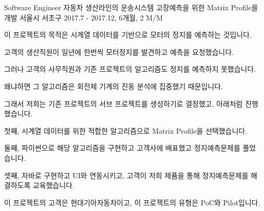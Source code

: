 \begin{cventries}
  \cventry
    {Software Engineer} %
    {자동차 생산라인의 운송시스템 고장예측을 위한 Matrix Profile을 개발} %
    {서울시 서초구} %
    {2017.7 - 2017.12, 6개월, 2 M/M} %
    {
      \begin{cvitems} %
        \item {이 프로젝트의 목적은 시계열 데이터를 기반으로 모터의 정지를 예측하는 것입니다.}
        \item {고객의 생산직원이 일년에 한번씩 모터정지를 발견하고 예측을 요청했습니다.}
        \item {그러나 고객의 사무직원과 기존 프로젝트의 알고리즘도 정지를 예측하지 못했습니다.}
        \item {왜냐하면 그 알고리즘은 회전체 기계의 진동 분석에 집중했기 때문입니다.}
        \item {그래서 저희는 기존 프로젝트의 서브 프로젝트를 생성하기로 결정했고, 아래처럼 진행했습니다.}
        \item {첫째, 시계열 데이터를 위한 적합한 알고리즘으로 Matrix Profile을 선택했습니다.}
        \item {둘째, 파이썬으로 해당 알고리즘을 구현하고 고객사에 배표했고 정지예측문제를 풀었습니다.}
        \item {셋째, 자바로 구현하고 UI와 연동시키고, 고객이 저희 제품을 통해 정지예측문제를 해결하도록 교육했습니다.}
        \item {이 프로젝트의 고객은 현대기아자동차이고, 이 프로젝트의 유형은 PoC와 Pilot입니다.}
      \end{cvitems}
    }


\end{cventries}
